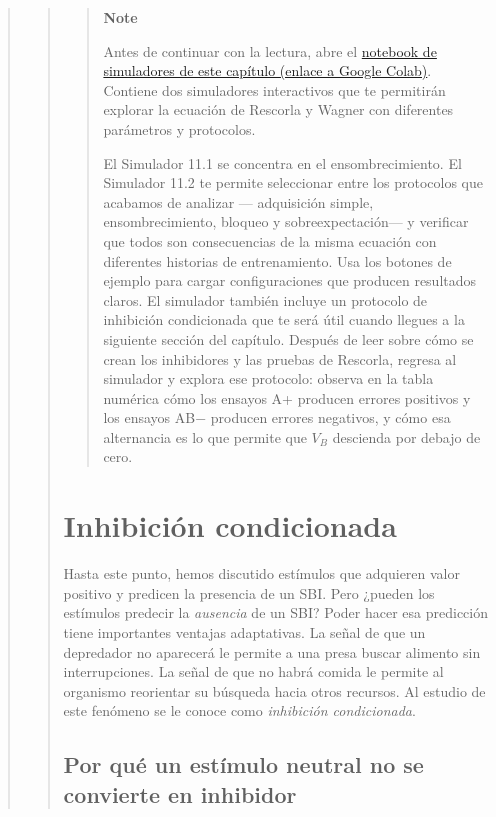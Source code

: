 \documentclass[
  letterpaper,
  DIV=11,
  numbers=noendperiod]{scrreprt}
\begin{document}
\begin{tcolorbox}[enhanced jigsaw, toprule=.15mm, arc=.35mm, colback=white, opacityback=0, colframe=quarto-callout-note-color-frame, breakable, rightrule=.15mm, left=2mm, leftrule=.75mm, bottomrule=.15mm]
\begin{quote}
\begin{quote}
\begin{quote}
\textbf{Note}

Antes de continuar con la lectura, abre el
\href{https://colab.research.google.com/github/arbouria/Libro-ACA-2026/blob/main/Simuladores/Rescorla_Wagner.ipynb}{notebook
de simuladores de este capítulo (enlace a Google Colab)}. Contiene dos
simuladores interactivos que te permitirán explorar la ecuación de
Rescorla y Wagner con diferentes parámetros y protocolos.

El Simulador 11.1 se concentra en el ensombrecimiento. El Simulador 11.2
te permite seleccionar entre los protocolos que acabamos de analizar ---
adquisición simple, ensombrecimiento, bloqueo y sobreexpectación--- y
verificar que todos son consecuencias de la misma ecuación con
diferentes historias de entrenamiento. Usa los botones de ejemplo para
cargar configuraciones que producen resultados claros. El simulador
también incluye un protocolo de inhibición condicionada que te será útil
cuando llegues a la siguiente sección del capítulo. Después de leer
sobre cómo se crean los inhibidores y las pruebas de Rescorla, regresa
al simulador y explora ese protocolo: observa en la tabla numérica cómo
los ensayos A+ producen errores positivos y los ensayos AB− producen
errores negativos, y cómo esa alternancia es lo que permite que
\(V_B\)\hspace{0pt} descienda por debajo de cero.
\end{quote}

\section{Inhibición condicionada}\label{inhibiciuxf3n-condicionada}

Hasta este punto, hemos discutido estímulos que adquieren valor positivo
y predicen la presencia de un SBI. Pero ¿pueden los estímulos predecir
la \emph{ausencia} de un SBI? Poder hacer esa predicción tiene
importantes ventajas adaptativas. La señal de que un depredador no
aparecerá le permite a una presa buscar alimento sin interrupciones. La
señal de que no habrá comida le permite al organismo reorientar su
búsqueda hacia otros recursos. Al estudio de este fenómeno se le conoce
como \emph{inhibición condicionada}.

\subsection{Por qué un estímulo neutral no se convierte en
inhibidor}\label{por-quuxe9-un-estuxedmulo-neutral-no-se-convierte-en-inhibidor}


\end{quote}
\end{quote}
\end{tcolorbox}
\end{document}
